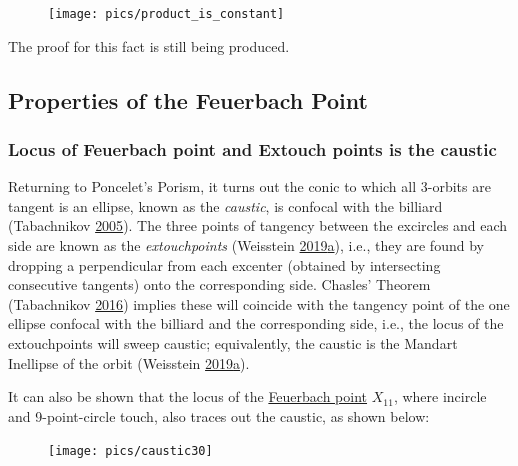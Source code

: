 \documentclass[]{article}
\begin{document}
\begin{figure}[H]

{\centering \texttt{[image: pics/product\_is\_constant]} 

}

\end{figure}

The proof for this fact is still being produced.

\hypertarget{properties-of-the-feuerbach-point}{%
\subsection{Properties of the Feuerbach Point}\label{properties-of-the-feuerbach-point}}

\hypertarget{locus-of-feuerbach-point-and-extouch-points-is-the-caustic}{%
\subsubsection{Locus of Feuerbach point and Extouch points is the caustic}\label{locus-of-feuerbach-point-and-extouch-points-is-the-caustic}}

Returning to Poncelet's Porism, it turns out the conic to which all 3-orbits are tangent is an ellipse, known as the \emph{caustic}, is confocal with the billiard (Tabachnikov \protect\hyperlink{ref-sergei91}{2005}). The three points of tangency between the excircles and each side are known as the \emph{extouchpoints} (Weisstein \protect\hyperlink{ref-mw}{2019}\protect\hyperlink{ref-mw}{a}), i.e., they are found by dropping a perpendicular from each excenter (obtained by intersecting consecutive tangents) onto the corresponding side. Chasles' Theorem (Tabachnikov \protect\hyperlink{ref-sergei2016proj}{2016}) implies these will coincide with the tangency point of the one ellipse confocal with the billiard and the corresponding side, i.e., the locus of the extouchpoints will sweep caustic; equivalently, the caustic is the Mandart Inellipse of the orbit (Weisstein \protect\hyperlink{ref-mw}{2019}\protect\hyperlink{ref-mw}{a}).

It can also be shown that the locus of the \href{https://en.wikipedia.org/wiki/Feuerbach_point}{Feuerbach point} \(X_{11}\), where incircle and 9-point-circle touch, also traces out the caustic, as shown below:

\begin{figure}[H]

{\centering \texttt{[image: pics/caustic30]} 

}

\end{figure}
\end{document}
